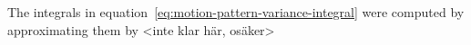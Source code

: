 The integrals in equation~\ref{eq:motion-pattern-variance-integral}
were computed by approximating them by <inte klar här, osäker>




